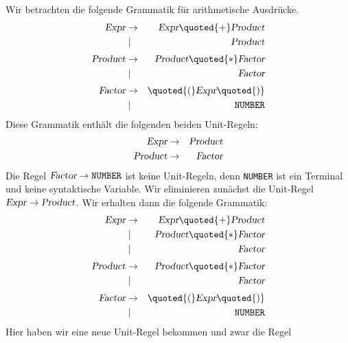 \example
Wir betrachten die folgende Grammatik f\"ur arithmetische Ausdr\"ucke.
\begin{eqnarray*}
  \textsl{Expr}      & \rightarrow & \textsl{Expr} \quoted{+} \textsl{Product}  \\
                     & \mid        & \textsl{Product}                                \\[0.1cm]
  \textsl{Product}   & \rightarrow & \textsl{Product} \quoted{*} \textsl{Factor}     \\
                     & \mid        & \textsl{Factor}                                 \\[0.1cm]
  \textsl{Factor}    & \rightarrow & \quoted{(} \textsl{Expr} \quoted{)}        \\
                     & \mid        & \texttt{NUMBER} 
\end{eqnarray*}
Diese Grammatik enth\"alt die folgenden beiden Unit-Regeln:
\begin{eqnarray*}
  \textsl{Expr}    & \rightarrow & \textsl{Product}                                \\
  \textsl{Product} & \rightarrow & \textsl{Factor}                                 
\end{eqnarray*}
Die Regel $\textsl{Factor} \rightarrow \texttt{NUMBER}$ ist keine Unit-Regeln, denn
\texttt{NUMBER} ist ein Terminal und keine syntaktische Variable.
Wir eliminieren zun\"achst die Unit-Regel $\textsl{Expr} \rightarrow \textsl{Product}$.  
Wir erhalten dann die folgende
Grammatik: 
\begin{eqnarray*}
  \textsl{Expr}      & \rightarrow & \textsl{Expr} \quoted{+} \textsl{Product}  \\
                     & \mid        & \textsl{Product} \quoted{*} \textsl{Factor}     \\
                     & \mid        & \textsl{Factor}                                 \\[0.1cm]
  \textsl{Product}   & \rightarrow & \textsl{Product} \quoted{*} \textsl{Factor}     \\
                     & \mid        & \textsl{Factor}                                 \\[0.1cm]
  \textsl{Factor}    & \rightarrow & \quoted{(} \textsl{Expr} \quoted{)}        \\
                     & \mid        & \texttt{NUMBER} 
\end{eqnarray*}
Hier haben wir eine neue Unit-Regel bekommen und zwar die Regel
\\[0.2cm]
